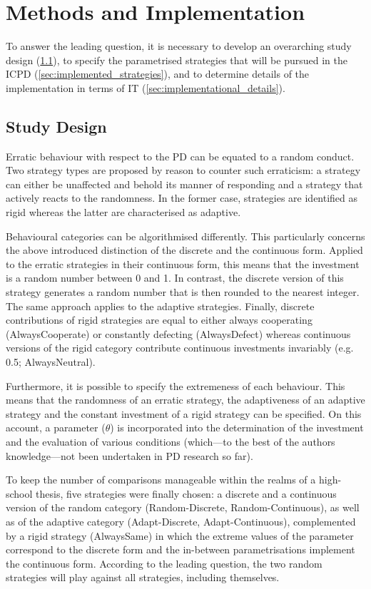 \documentclass[11pt]{article}
\begin{document}
\section{Methods and Implementation} \label{sec:methods_and_implementation}

To answer the leading question, it is necessary to develop an overarching study design (\ref{sec:study_design}), to specify the parametrised strategies that will be pursued in the ICPD (\ref{sec:implemented_strategies}), and to determine details of the implementation in terms of IT (\ref{sec:implementational_details}).

\subsection{Study Design} \label{sec:study_design}

Erratic behaviour with respect to the PD can be equated to a random conduct.
Two strategy types are proposed by reason to counter such erraticism:
a strategy can either be unaffected and behold its manner of responding and a strategy that actively reacts to the randomness.
In the former case, strategies are identified as rigid whereas the latter are characterised as adaptive.

Behavioural categories can be algorithmised differently.
This particularly concerns the above introduced distinction of the discrete and the continuous form.
Applied to the erratic strategies in their continuous form, this means that the investment is a random number between 0 and 1.
In contrast, the discrete version of this strategy generates a random number that is then rounded to the nearest integer.
The same approach applies to the adaptive strategies.
Finally, discrete contributions of rigid strategies are equal to either always cooperating (AlwaysCooperate) or constantly defecting (AlwaysDefect) whereas continuous versions of the rigid category contribute continuous investments invariably (e.g. 0.5; AlwaysNeutral).

Furthermore, it is possible to specify the extremeness of each behaviour.
This means that the randomness of an erratic strategy, the adaptiveness of an adaptive strategy and the constant investment of a rigid strategy can be specified.
On this account, a parameter ($\theta$) is incorporated into the determination of the investment and the evaluation of various conditions (which---to the best of the authors knowledge---not been undertaken in PD research so far).

To keep the number of comparisons manageable within the realms of a high-school thesis, five strategies were finally chosen:
a discrete and a continuous version of the random category (Random-Discrete, Random-Continuous), as well as of the adaptive category (Adapt-Discrete, Adapt-Continuous), complemented by a rigid strategy (AlwaysSame) in which the extreme values of the parameter correspond to the discrete form and the in-between parametrisations implement the continuous form.
According to the leading question, the two random strategies will play against all strategies, including themselves.
\end{document}
